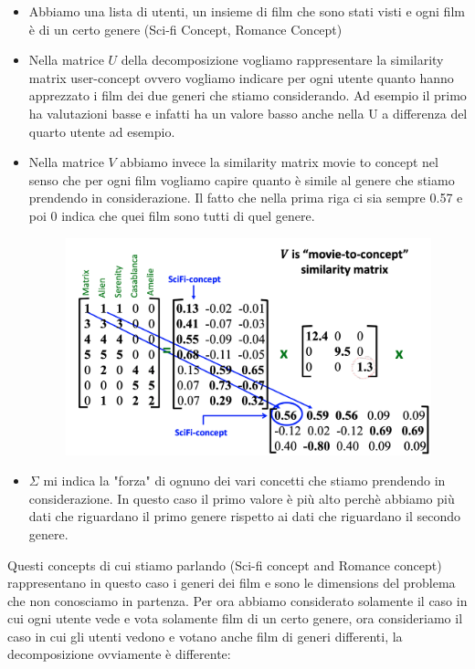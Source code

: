 \documentclass[14pt]{extreport}
\begin{document}
\begin{itemize}
	\item Abbiamo una lista di utenti, un insieme di film che sono stati visti e ogni film è di un certo genere (Sci-fi Concept, Romance Concept)
	\item Nella matrice $U$ della decomposizione vogliamo rappresentare la similarity matrix user-concept ovvero vogliamo indicare per ogni utente
	      quanto hanno apprezzato i film dei due generi che stiamo considerando. Ad esempio il primo ha valutazioni basse e infatti ha un valore basso
	      anche nella U a differenza del quarto utente ad esempio.
	\item Nella matrice $V$ abbiamo invece la similarity matrix movie to concept nel senso che per ogni film vogliamo capire quanto è simile al genere
	      che stiamo prendendo in considerazione. Il fatto che nella prima riga ci sia sempre 0.57 e poi 0 indica che quei film sono tutti di quel
	      genere.

	      \begin{figure}[H]
		      \centering
		      \includegraphics[width=0.7\linewidth]{500.jpeg}
	      \end{figure}

	\item $\Sigma$ mi indica la "forza" di ognuno dei vari concetti che stiamo prendendo in considerazione. In questo caso il primo valore è più alto
	      perchè abbiamo più dati che riguardano il primo genere rispetto ai dati che riguardano il secondo genere.
\end{itemize}

Questi concepts di cui stiamo parlando (Sci-fi concept and Romance concept) rappresentano in questo caso i generi dei film e sono le dimensions del
problema che non conosciamo in partenza. Per ora abbiamo considerato solamente il caso in cui ogni utente vede e vota solamente film di un certo
genere, ora consideriamo il caso in cui gli utenti vedono e votano anche film di generi differenti, la decomposizione ovviamente è differente:
\end{document}

